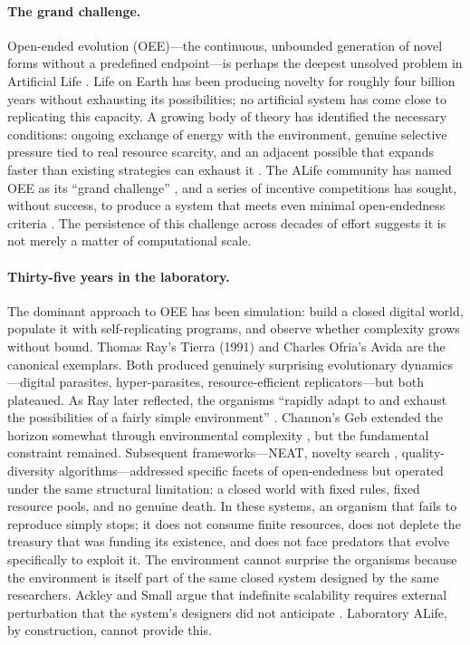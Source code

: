 \paragraph{The grand challenge.}
Open-ended evolution (OEE)---the continuous, unbounded generation of novel forms without a predefined endpoint---is perhaps the deepest unsolved problem in Artificial Life \cite{Packard2019Overview,Bedau2003Artificial}. Life on Earth has been producing novelty for roughly four billion years without exhausting its possibilities; no artificial system has come close to replicating this capacity. A growing body of theory has identified the necessary conditions: ongoing exchange of energy with the environment, genuine selective pressure tied to real resource scarcity, and an adjacent possible that expands faster than existing strategies can exhaust it \cite{taylor2012exploring,Soros2014Necessary,Corominas2018}. The ALife community has named OEE as its ``grand challenge'' \cite{Packard2019a}, and a series of incentive competitions has sought, without success, to produce a system that meets even minimal open-endedness criteria \cite{stanley2017openendedness,Hughes2024OpenEndednessa}. The persistence of this challenge across decades of effort suggests it is not merely a matter of computational scale.

\paragraph{Thirty-five years in the laboratory.}
The dominant approach to OEE has been simulation: build a closed digital world, populate it with self-replicating programs, and observe whether complexity grows without bound. Thomas Ray's Tierra (1991) and Charles Ofria's Avida \cite{Ofria2004Avida} are the canonical exemplars. Both produced genuinely surprising evolutionary dynamics---digital parasites, hyper-parasites, resource-efficient replicators---but both plateaued. As Ray later reflected, the organisms ``rapidly adapt to and exhaust the possibilities of a fairly simple environment'' \cite{Ray1994Evolution,ray1996approach}. Channon's Geb extended the horizon somewhat through environmental complexity \cite{channon2003improving}, but the fundamental constraint remained. Subsequent frameworks---NEAT, novelty search \cite{Lehman2011}, quality-diversity algorithms---addressed specific facets of open-endedness but operated under the same structural limitation: a closed world with fixed rules, fixed resource pools, and no genuine death. In these systems, an organism that fails to reproduce simply stops; it does not consume finite resources, does not deplete the treasury that was funding its existence, and does not face predators that evolve specifically to exploit it. The environment cannot surprise the organisms because the environment is itself part of the same closed system designed by the same researchers. Ackley and Small argue that indefinite scalability requires external perturbation that the system's designers did not anticipate \cite{ackley2014indefinitely}. Laboratory ALife, by construction, cannot provide this.

